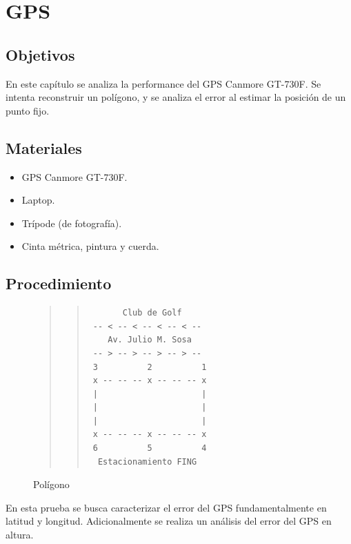 \documentclass[main]{subfiles}
\begin{document}
\chapter{GPS}
\label{chap-gps}

\section{Objetivos}

En este capítulo se analiza la performance del GPS Canmore GT-730F. Se intenta reconstruir un polígono, y se analiza el error al estimar la posición de un punto fijo.

\section{Materiales}

\begin{itemize}
\item GPS Canmore GT-730F.
\item Laptop.
\item Trípode (de fotografía).
\item Cinta métrica, pintura y cuerda.
\end{itemize}

\section{Procedimiento}
\label{sec:gps2-procedimiento}

\begin{figure}
\vspace{-200pt}
\begin{quote}
\begin{quote}
\begin{verbatim}
       Club de Golf
 -- < -- < -- < -- < --
    Av. Julio M. Sosa
 -- > -- > -- > -- > --
 3          2          1
 x -- -- -- x -- -- -- x
 |                     |
 |                     |
 |                     |
 x -- -- -- x -- -- -- x
 6          5          4
  Estacionamiento FING
\end{verbatim}
\end{quote}
\end{quote}
\vspace{-10pt}
\caption{Polígono}
\vspace{-20pt}
\label{fig:pol-pedorro}
\end{figure}

En esta prueba se busca caracterizar el error del GPS fundamentalmente en latitud y longitud. Adicionalmente se realiza un an\'alisis del error del GPS en altura.
\end{document}
